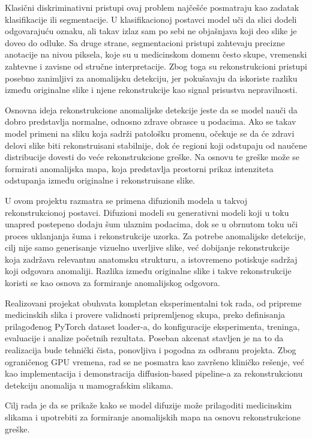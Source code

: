 \documentclass[10pt]{article}
\begin{document}
	Klasični diskriminativni pristupi ovaj problem najčešće posmatraju kao zadatak klasifikacije ili segmentacije. U klasifikacionoj postavci model uči da slici dodeli odgovarajuću oznaku, ali takav izlaz sam po sebi ne objašnjava koji deo slike je doveo do odluke. Sa druge strane, segmentacioni pristupi zahtevaju precizne anotacije na nivou piksela, koje su u medicinskom domenu često skupe, vremenski zahtevne i zavisne od stručne interpretacije. Zbog toga su rekonstrukcioni pristupi posebno zanimljivi za anomalijsku detekciju, jer pokušavaju da iskoriste razliku između originalne slike i njene rekonstrukcije kao signal prisustva nepravilnosti.
	
	Osnovna ideja rekonstrukcione anomalijske detekcije jeste da se model nauči da dobro predstavlja normalne, odnosno zdrave obrasce u podacima. Ako se takav model primeni na sliku koja sadrži patološku promenu, očekuje se da će zdravi delovi slike biti rekonstruisani stabilnije, dok će regioni koji odstupaju od naučene distribucije dovesti do veće rekonstrukcione greške. Na osnovu te greške može se formirati anomalijska mapa, koja predstavlja prostorni prikaz intenziteta odstupanja između originalne i rekonstruisane slike.
	
	U ovom projektu razmatra se primena difuzionih modela u takvoj rekonstrukcionoj postavci. Difuzioni modeli su generativni modeli koji u toku unapred postepeno dodaju šum ulaznim podacima, dok se u obrnutom toku uči proces uklanjanja šuma i rekonstrukcije uzorka. Za potrebe anomalijske detekcije, cilj nije samo generisanje vizuelno uverljive slike, već dobijanje rekonstrukcije koja zadržava relevantnu anatomsku strukturu, a istovremeno potiskuje sadržaj koji odgovara anomaliji. Razlika između originalne slike i takve rekonstrukcije koristi se kao osnova za formiranje anomalijskog odgovora.
	
	Realizovani projekat obuhvata kompletan eksperimentalni tok rada, od pripreme medicinskih slika i provere validnosti pripremljenog skupa, preko definisanja prilagođenog PyTorch dataset loader-a, do konfiguracije eksperimenta, treninga, evaluacije i analize početnih rezultata. Poseban akcenat stavljen je na to da realizacija bude tehnički čista, ponovljiva i pogodna za odbranu projekta. Zbog ograničenog GPU vremena, rad se ne posmatra kao završeno kliničko rešenje, već kao implementacija i demonstracija diffusion-based pipeline-a za rekonstrukcionu detekciju anomalija u mamografskim slikama.
	
	Cilj rada je da se prikaže kako se model difuzije može prilagoditi medicinskim slikama i upotrebiti za formiranje anomalijskih mapa na osnovu rekonstrukcione greške. 
	
\end{document}
